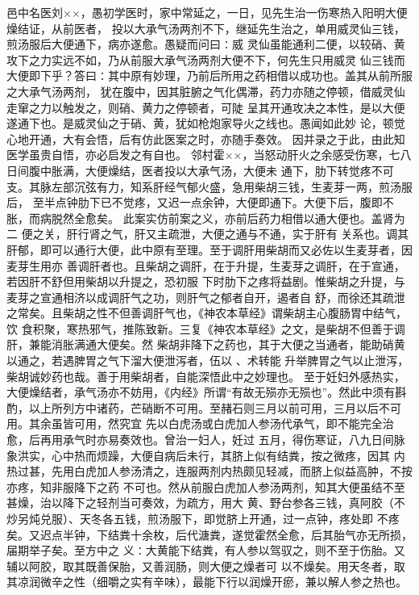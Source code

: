 \documentclass[a4paper,12pt,UTF8,twoside]{ctexbook}
\begin{document}
邑中名医刘××，愚初学医时，家中常延之，一日，见先生治一伤寒热入阳明大便燥结证，从前医者， 
投以大承气汤两剂不下，继延先生治之，单用威灵仙三钱，煎汤服后大便通下，病亦遂愈。愚疑而问曰∶威 
灵仙虽能通利二便，以较硝、黄攻下之力实远不如，乃从前服大承气汤两剂大便不下，何先生只用威灵 
仙三钱而大便即下乎？答曰∶其中原有妙理，乃前后所用之药相借以成功也。盖其从前所服之大承气汤两剂， 
犹在腹中，因其脏腑之气化偶滞，药力亦随之停顿，借威灵仙走窜之力以触发之，则硝、黄力之停顿者，可陡 
呈其开通攻决之本性，是以大便遂通下也。是威灵仙之于硝、黄，犹如枪炮家导火之线也。愚闻如此妙 
论，顿觉心地开通，大有会悟，后有仿此医案之时，亦随手奏效。 
因并录之于此，由此知医学虽贵自悟，亦必启发之有自也。 
邻村霍××，当怒动肝火之余感受伤寒，七八日间腹中胀满，大便燥结，医者投以大承气汤，大便未 
通下，肋下转觉疼不可支。其脉左部沉弦有力，知系肝经气郁火盛，急用柴胡三钱，生麦芽一两，煎汤服后， 
至半点钟肋下已不觉疼，又迟一点余钟，大便即通下。大便下后，腹即不胀，而病脱然全愈矣。 
此案实仿前案之义，亦前后药力相借以通大便也。盖肾为二 
便之关，肝行肾之气，肝又主疏泄，大便之通与不通，实于肝有 
关系也。调其肝郁，即可以通行大便，此中原有至理。至于调肝用柴胡而又必佐以生麦芽者，因麦芽生用亦 
善调肝者也。且柴胡之调肝，在于升提，生麦芽之调肝，在于宣通，若因肝不舒但用柴胡以升提之，恐初服 
下时肋下之疼将益剧。惟柴胡之升提，与麦芽之宣通相济以成调肝气之功，则肝气之郁者自开，遏者自 
舒，而徐还其疏泄之常矣。且柴胡之性不但善调肝气也，《神农本草经》谓柴胡主心腹肠胃中结气，饮 
食积聚，寒热邪气，推陈致新。三复《神农本草经》之文，是柴胡不但善于调肝，兼能消胀满通大便矣。然 
柴胡非降下之药也，其于大便之当通者，能助硝黄以通之，若遇脾胃之气下溜大便泄泻者，伍以 、术转能 
升举脾胃之气以止泄泻，柴胡诚妙药也哉。善于用柴胡者，自能深悟此中之妙理也。 
至于妊妇外感热实，大便燥结者，承气汤亦不妨用，《内经》所谓“有故无殒亦无殒也”。然此中须有斟 
酌，以上所列方中诸药，芒硝断不可用。至赭石则三月以前可用，三月以后不可用。其余虽皆可用，然究宜 
先以白虎汤或白虎加人参汤代承气，即不能完全治愈，后再用承气时亦易奏效也。曾治一妇人，妊过 
五月，得伤寒证，八九日间脉象洪实，心中热而烦躁，大便自病后未行，其脐上似有结粪，按之微疼，因其 
内热过甚，先用白虎加人参汤清之，连服两剂内热颇见轻减，而脐上似益高肿，不按亦疼，知非服降下之药 
不可也。然从前服白虎加人参汤两剂，知其大便虽结不至甚燥，治以降下之轻剂当可奏效，为疏方，用大 
黄、野台参各三钱，真阿胶（不炒另炖兑服）、天冬各五钱，煎汤服下，即觉脐上开通，过一点钟，疼处即 
不疼矣。又迟点半钟，下结粪十余枚，后代溏粪，遂觉霍然全愈，后其胎气亦无所损，届期举子矣。至方中之 
义∶大黄能下结粪，有人参以驾驭之，则不至于伤胎。又辅以阿胶，取其既善保胎，又善润肠，则大便之燥者可 
以不燥矣。用天冬者，取其凉润微辛之性（细嚼之实有辛味），最能下行以润燥开瘀，兼以解人参之热也。 
\end{document}
